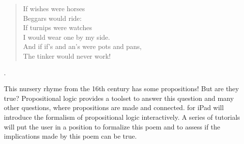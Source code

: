


\begin{minipage}[t]{180mm}
\begin{verse}
If wishes were horses \\
Beggars would ride: \\
If turnips were watches \\
I would wear one by my side. \\
And if if's and an's were pots and pans, \\
The tinker would never work!
\end{verse}.
\end{minipage}

This nursery rhyme from the 16th century has some propositions! But are they true? 
Propositional logic provides a toolset to answer this question and many other questions,
where propositions are made and connected. 
\Nyaya for iPad
will introduce the formalism of propositional logic interactively.
A series of tutorials will put the user in a position
to formalize this poem
and to assess if the implications made by this poem can be true.
